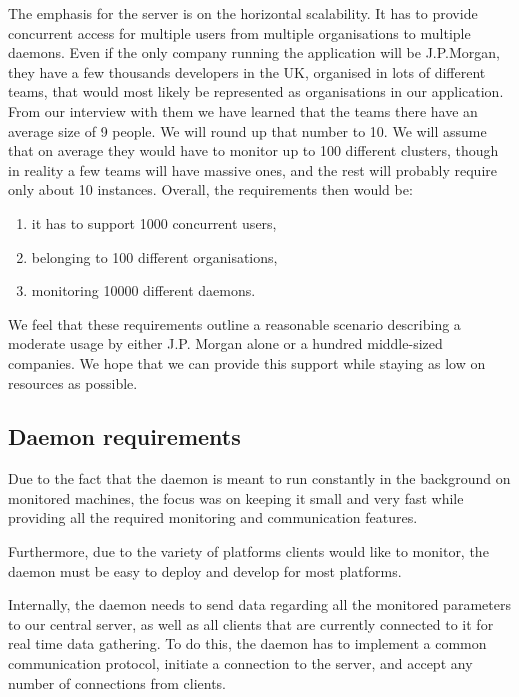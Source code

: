 \documentclass{l3proj}
\begin{document}
The emphasis for the server is on the horizontal scalability. It has to provide concurrent access for multiple users from multiple organisations to multiple daemons. Even if the only company running the application will be J.P.Morgan, they have a few thousands developers in the UK, organised in lots of different teams, that would most likely be represented as organisations in our application. From our interview with them we have learned that the teams there have an average size of 9 people. We will round up that number to 10. We will assume that on average they would have to monitor up to 100 different clusters, though in reality a few teams will have massive ones, and the rest will probably require only about 10 instances. Overall, the requirements then would be:
\begin{enumerate}
\item it has to support 1000 concurrent users,
\item belonging to 100 different organisations,
\item monitoring 10000 different daemons.
\end{enumerate}

We feel that these requirements outline a reasonable scenario describing a moderate usage by either J.P. Morgan alone or a hundred middle-sized companies. We hope that we can provide this support while staying as low on resources as possible.

\subsection{Daemon requirements}

Due to the fact that the daemon is meant to run constantly in the background on monitored machines, the focus was on keeping it small and very fast while providing all the required monitoring and communication features.

Furthermore, due to the variety of platforms clients would like to monitor, the daemon must be easy to deploy and develop for most platforms.

Internally, the daemon needs to send data regarding all the monitored parameters to our central server, as well as all clients that are currently connected to it for real time data gathering. To do this, the daemon has to implement a common communication protocol, initiate a connection to the server, and accept any number of connections from clients.

\end{document}
